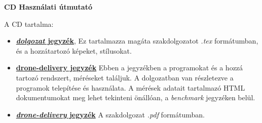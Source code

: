 \pagestyle{empty}

\noindent \textbf{\Large CD Használati útmutató}
%
%
%


A CD tartalma:
\begin{itemize}
    \item \textbf{\underline{\textit{dolgozat} jegyzék}},
    Ez tartalmazza magáta szakdolgozatot \textit{.tex} formátumban, és a hozzátartozó képeket, stílusokat.
    \item \textbf{\underline{drone-delivery jegyzék}}
    Ebben a jegyzékben a programokat és a hozzá tartozó rendszert, méréseket találjuk.
    A dolgozatban van részletezve a programok telepítése és használata.
    A mérések adatait tartalmazó HTML dokumentumokat meg lehet tekinteni önállóan, a \textit{benchmark} jegyzéken belül.
    \item \textbf{\underline{\textit{drone-delivery} jegyzék}}
    A szakdolgozat \textit{.pdf} formátumban.
\end{itemize}



